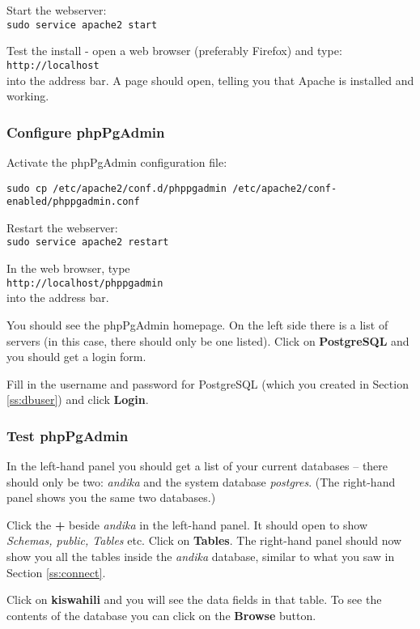 \documentclass[a4paper,10pt]{article}
\begin{document}
Start the webserver:\\
\verb|sudo service apache2 start|

Test the install - open a web browser (preferably Firefox) and type:\\
\verb|http://localhost|\\
into the address bar. A page should open, telling you that Apache is installed and working.

\subsubsection{Configure phpPgAdmin}

Activate the phpPgAdmin configuration file:

\verb|sudo cp /etc/apache2/conf.d/phppgadmin /etc/apache2/conf-enabled/phppgadmin.conf|

Restart the webserver:\\
\verb|sudo service apache2 restart|

In the web browser, type\\
\verb|http://localhost/phppgadmin|\\
into the address bar.

You should see the phpPgAdmin homepage. On the left side there is a list of servers (in this case, there should only be one listed). Click on \textbf{PostgreSQL} and you should get a login form.

Fill in the username and password for PostgreSQL (which you created in Section \ref{ss:dbuser}) and click \textbf{Login}.

\subsubsection{Test phpPgAdmin}
\label{ss:testppa}

In the left-hand panel you should get a list of your current databases -- there should only be two: \textit{andika} and the system database \textit{postgres}. (The right-hand panel shows you the same two databases.)

Click the \textbf{+} beside \textit{andika} in the left-hand panel.  It should open to show \textit{Schemas, public, Tables} etc. Click on \textbf{Tables}. The right-hand panel should now show you all the tables inside the \textit{andika} database, similar to what you saw in Section \ref{ss:connect}.

Click on \textbf{kiswahili} and you will see the data fields in that table. To see the contents of the database you can click on the \textbf{Browse} button.
\end{document}
